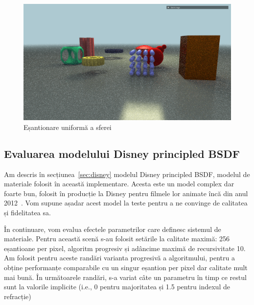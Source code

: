 \documentclass[12pt,a4paper]{report}
\numberwithin{equation}{section} %
\begin{document}
\begin{figure}[!htb]
	\centering
	\includegraphics[width=\textwidth]{pics/demo-uniform.png}
	\caption{Eșantionare uniformă a sferei}
	\label{fig:eval-uniform}
\end{figure}


\subsection{Evaluarea modelului Disney principled BSDF}

Am descris în secțiunea~\ref{sec:disney} modelul Disney principled BSDF, modelul
de materiale folosit în această implementare. Acesta este un model complex dar foarte bun,
folosit în producție la Disney pentru filmele lor animate încă din anul 2012~\cite{Disney}.
Vom supune așadar acest model la teste pentru a ne convinge de calitatea și fidelitatea sa. 

În continuare, vom evalua efectele parametrilor care definesc sistemul de materiale. Pentru această
scenă s-au folosit setările la calitate maximă: 256 eșantioane per pixel, algoritm progresiv și adâncime
maximă de recursivitate 10. Am folosit pentru aceste randări varianta progresivă a algoritmului,
pentru a obține performanțe comparabile cu un singur eșantion per pixel dar calitate mult mai bună.
În următoarele randări, s-a variat câte un parametru
în timp ce restul sunt la valorile implicite (i.e., 0 pentru majoritatea și 1.5 pentru
indexul de refracție)
\end{document}
